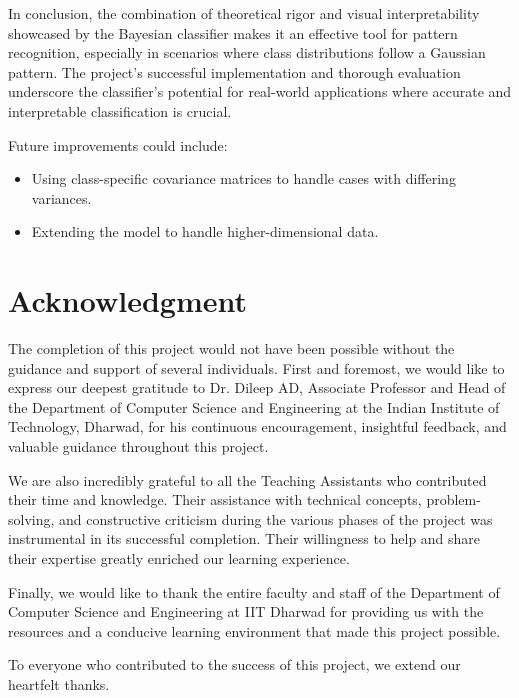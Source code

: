 \documentclass[conference]{IEEEtran}
\begin{document}
	In conclusion, the combination of theoretical rigor and visual interpretability showcased by the Bayesian classifier makes it an effective tool for pattern recognition, especially in scenarios where class distributions follow a Gaussian pattern. The project's successful implementation and thorough evaluation underscore the classifier’s potential for real-world applications where accurate and interpretable classification is crucial.
	
	Future improvements could include:
	\begin{itemize}
		\item Using class-specific covariance matrices to handle cases with differing variances.
		\item Extending the model to handle higher-dimensional data.
	\end{itemize}
	
	\section*{Acknowledgment}
	
	The completion of this project would not have been possible without the guidance and support of several individuals. First and foremost, we would like to express our deepest gratitude to Dr. Dileep AD, Associate Professor and Head of the Department of Computer Science and Engineering at the Indian Institute of Technology, Dharwad, for his continuous encouragement, insightful feedback, and valuable guidance throughout this project.
	
	We are also incredibly grateful to all the Teaching Assistants who contributed their time and knowledge. Their assistance with technical concepts, problem-solving, and constructive criticism during the various phases of the project was instrumental in its successful completion. Their willingness to help and share their expertise greatly enriched our learning experience.
	
	Finally, we would like to thank the entire faculty and staff of the Department of Computer Science and Engineering at IIT Dharwad for providing us with the resources and a conducive learning environment that made this project possible.
	
	To everyone who contributed to the success of this project, we extend our heartfelt thanks.
\end{document}
